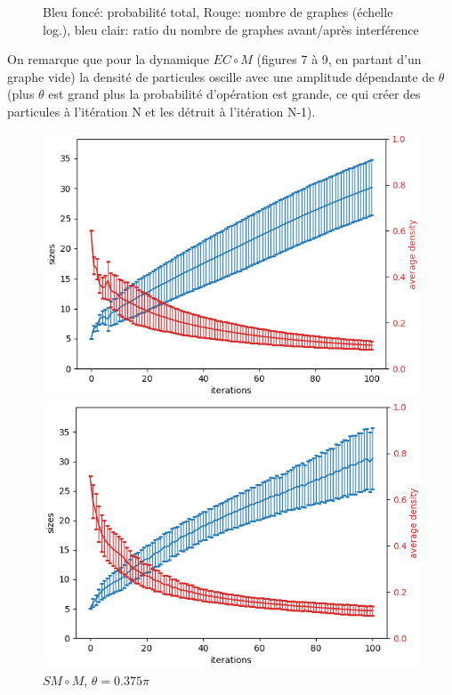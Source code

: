 \documentclass[11pts,french]{article}
\begin{document}
\begin{figure}[h!]
\captionsetup{labelformat=empty}
\caption{Bleu foncé: probabilité total, Rouge: nombre de graphes (échelle log.), bleu clair: ratio du nombre de graphes avant/après interférence }

\end{figure}

On remarque que pour la dynamique $EC \circ M$ (figures 7 à 9, en partant d'un graphe vide) la densité de particules oscille avec une amplitude dépendante de $\theta$ (plus $\theta$ est grand plus la probabilité d'opération est grande, ce qui créer des particules à l'itération N et les détruit à l'itération N-1). \\

\begin{figure}[h!]
\begin{minipage}{0.33\textwidth}
\centering
\includegraphics[width=\textwidth, height=0.66\textwidth]{sizes/0_split_merge_move}
\caption{$SM\circ M$, $\theta=0.375\pi$}
\end{minipage}
\begin{minipage}{0.33\textwidth}
\centering
\includegraphics[width=\textwidth, height=0.66\textwidth]{sizes/1_split_merge_move}

\end{minipage}
\end{figure}
\end{document}

